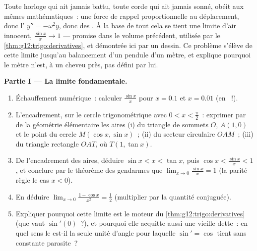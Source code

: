 \begin{problem}
\label{pb:g12:trigo:1}
Toute horloge qui ait jamais battu, toute corde qui ait jamais
sonné, obéit aux mêmes mathématiques~: une force de rappel
proportionnelle au déplacement, donc l' $y'' = -\omega^2 y$,
donc des . À la base de tout cela se tient une limite d'air
innocent, $\frac{\sin x}{x} \to 1$ --- promise dans le volume
précédent, utilisée par le \cref{thm:g12:trigo:derivatives}, et
démontrée ici par un dessin. Ce problème s'élève de cette limite
jusqu'au balancement d'un pendule d'un mètre, et explique pourquoi
le mètre n'est, à un cheveu près, pas défini par lui.

\medskip
\noindent\textbf{Partie I --- La limite fondamentale.}
\begin{enumerate}
  \item Échauffement numérique~: calculer $\frac{\sin x}{x}$ pour
        $x = 0.1$ et $x = 0.01$ (en ~!).
  \item L'encadrement, sur le cercle trigonométrique avec
        $0 < x < \frac\pi2$~: exprimer par de la géométrie
        élémentaire les aires (i) du triangle de sommets $O$,
        $A(1,0)$ et le point du cercle $M(\cos x, \sin x)$~; (ii) du
        secteur circulaire $OAM$~; (iii) du triangle rectangle
        $OAT$, où $T(1, \tan x)$.
  \item De l'encadrement des aires, déduire
        $\sin x < x < \tan x$, puis
        $\cos x < \frac{\sin x}{x} < 1$, et conclure par le théorème
        des gendarmes que $\lim_{x \to 0} \frac{\sin x}{x} = 1$ (la
        parité règle le cas $x < 0$).
  \item En déduire $\lim_{x \to 0} \frac{1 - \cos x}{x^2} =
        \frac12$ (multiplier par la quantité conjuguée).
  \item Expliquer pourquoi cette limite est le moteur du
        \cref{thm:g12:trigo:derivatives} (que vaut $\sin'(0)$~?), et
        pourquoi elle acquitte aussi une vieille dette~: en quel
        sens le \emph{} est-il la seule unité d'angle pour
        laquelle $\sin' = \cos$ tient sans constante parasite~?
\end{enumerate}


\end{problem}
